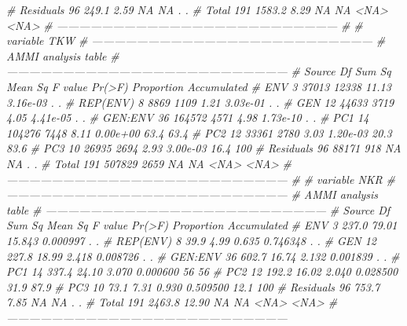 \documentclass[
]{book}
\newenvironment{Shaded}{\begin{snugshade}}{\end{snugshade}}
\newcommand{\CommentTok}[1]{\textcolor[rgb]{0.56,0.35,0.01}{\textit{#1}}}
\begin{document}
\begin{Shaded}
\begin{Highlighting}[]
{\CommentTok{#  Residuals  96  249.1    2.59      NA       NA          .           .}
\CommentTok{#      Total 191 1583.2    8.29      NA       NA       <NA>        <NA>}
\CommentTok{# ---------------------------------------------------------------------------}
\CommentTok{# }
\CommentTok{# variable TKW }
\CommentTok{# ---------------------------------------------------------------------------}
\CommentTok{# AMMI analysis table}
\CommentTok{# ---------------------------------------------------------------------------}
\CommentTok{#     Source  Df Sum Sq Mean Sq F value   Pr(>F) Proportion Accumulated}
\CommentTok{#        ENV   3  37013   12338   11.13 3.16e-03          .           .}
\CommentTok{#   REP(ENV)   8   8869    1109    1.21 3.03e-01          .           .}
\CommentTok{#        GEN  12  44633    3719    4.05 4.41e-05          .           .}
\CommentTok{#    GEN:ENV  36 164572    4571    4.98 1.73e-10          .           .}
\CommentTok{#        PC1  14 104276    7448    8.11 0.00e+00       63.4        63.4}
\CommentTok{#        PC2  12  33361    2780    3.03 1.20e-03       20.3        83.6}
\CommentTok{#        PC3  10  26935    2694    2.93 3.00e-03       16.4         100}
\CommentTok{#  Residuals  96  88171     918      NA       NA          .           .}
\CommentTok{#      Total 191 507829    2659      NA       NA       <NA>        <NA>}
\CommentTok{# ---------------------------------------------------------------------------}
\CommentTok{# }
\CommentTok{# variable NKR }
\CommentTok{# ---------------------------------------------------------------------------}
\CommentTok{# AMMI analysis table}
\CommentTok{# ---------------------------------------------------------------------------}
\CommentTok{#     Source  Df Sum Sq Mean Sq F value   Pr(>F) Proportion Accumulated}
\CommentTok{#        ENV   3  237.0   79.01  15.843 0.000997          .           .}
\CommentTok{#   REP(ENV)   8   39.9    4.99   0.635 0.746348          .           .}
\CommentTok{#        GEN  12  227.8   18.99   2.418 0.008726          .           .}
\CommentTok{#    GEN:ENV  36  602.7   16.74   2.132 0.001839          .           .}
\CommentTok{#        PC1  14  337.4   24.10   3.070 0.000600         56          56}
\CommentTok{#        PC2  12  192.2   16.02   2.040 0.028500       31.9        87.9}
\CommentTok{#        PC3  10   73.1    7.31   0.930 0.509500       12.1         100}
\CommentTok{#  Residuals  96  753.7    7.85      NA       NA          .           .}
\CommentTok{#      Total 191 2463.8   12.90      NA       NA       <NA>        <NA>}
\CommentTok{# ---------------------------------------------------------------------------}
}
\end{Highlighting}
\end{Shaded}
\end{document}
